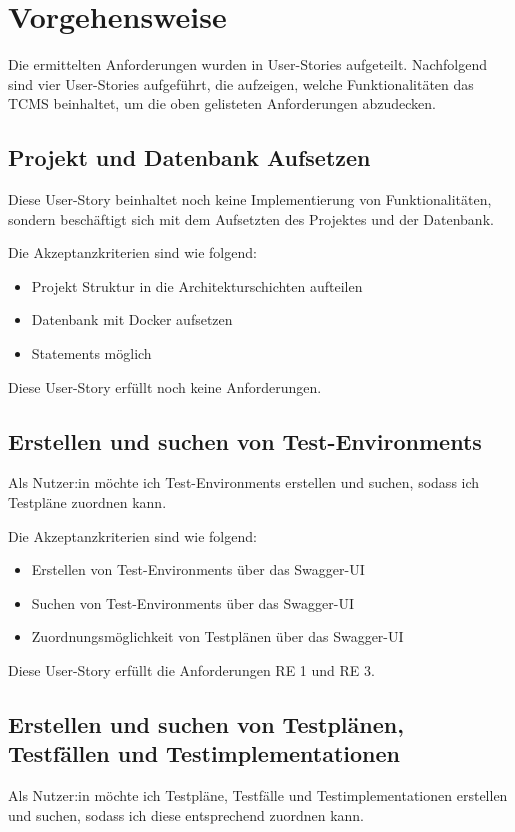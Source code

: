 \documentclass[a4paper, fontsize=11pt, parskip=half, twoside]{scrreprt}
\begin{document}
	\section{Vorgehensweise} \label{sec:userStoriesDefinition}
	Die ermittelten Anforderungen wurden in User-Stories aufgeteilt. 
	Nachfolgend sind vier User-Stories aufgeführt, die aufzeigen, welche Funktionalitäten das \ac{TCMS} beinhaltet, um die oben gelisteten Anforderungen abzudecken.
	
	\subsection{Projekt und Datenbank Aufsetzen}
	Diese User-Story beinhaltet noch keine Implementierung von Funktionalitäten, sondern beschäftigt sich mit dem Aufsetzten des Projektes und der Datenbank.
	
	Die Akzeptanzkriterien sind wie folgend:
	\begin{itemize}
		\item Projekt Struktur in die Architekturschichten aufteilen 
		\item Datenbank mit Docker aufsetzen
		\item {} Statements möglich
	\end{itemize}

	Diese User-Story erfüllt noch keine Anforderungen.
	
	\subsection{Erstellen und suchen von Test-Environments}
	Als Nutzer:in möchte ich Test-Environments erstellen und suchen, sodass ich Testpläne zuordnen kann.
	
	Die Akzeptanzkriterien sind wie folgend:
	\begin{itemize}
		\item Erstellen von Test-Environments über das Swagger-UI
		\item Suchen von Test-Environments über das Swagger-UI
		\item Zuordnungsmöglichkeit von Testplänen über das Swagger-UI
	\end{itemize}

	Diese User-Story erfüllt die Anforderungen RE 1 und RE 3.

	\subsection{Erstellen und suchen von Testplänen, Testfällen und Testimplementationen}
	Als Nutzer:in möchte ich Testpläne, Testfälle und Testimplementationen erstellen und suchen, sodass ich diese entsprechend zuordnen kann.
	
\end{document}
